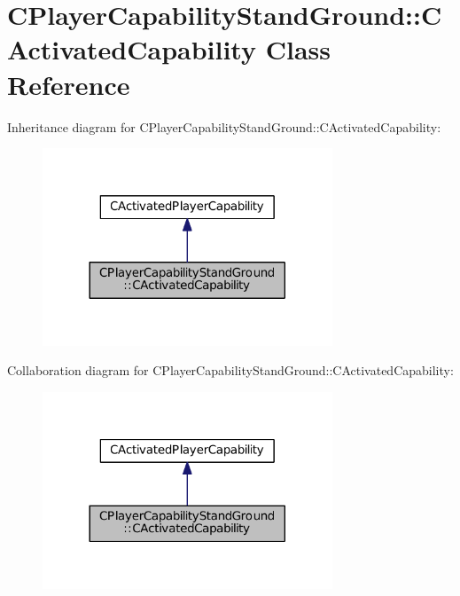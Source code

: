 \hypertarget{classCPlayerCapabilityStandGround_1_1CActivatedCapability}{}\section{C\+Player\+Capability\+Stand\+Ground\+:\+:C\+Activated\+Capability Class Reference}
\label{classCPlayerCapabilityStandGround_1_1CActivatedCapability}


Inheritance diagram for C\+Player\+Capability\+Stand\+Ground\+:\+:C\+Activated\+Capability\+:
\nopagebreak
\begin{figure}[H]
\begin{center}
\leavevmode
\includegraphics[width=245pt]{classCPlayerCapabilityStandGround_1_1CActivatedCapability__inherit__graph}
\end{center}
\end{figure}


Collaboration diagram for C\+Player\+Capability\+Stand\+Ground\+:\+:C\+Activated\+Capability\+:
\nopagebreak
\begin{figure}[H]
\begin{center}
\leavevmode
\includegraphics[width=245pt]{classCPlayerCapabilityStandGround_1_1CActivatedCapability__coll__graph}
\end{center}
\end{figure}
